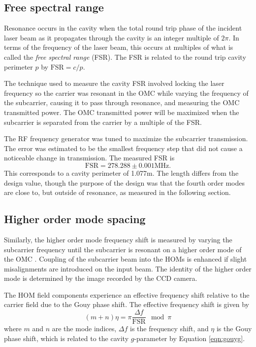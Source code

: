 \subsection{Free spectral range}
\label{sec:FSR}
Resonance occurs in the cavity when the total round trip phase of the incident laser beam as it propagates through the cavity is an integer multiple of $2\pi$. %
In terms of the frequency of the laser beam, this occurs at multiples of what is called the \emph{free spectral range} (FSR). %
The FSR is related to the round trip cavity perimeter $p$ by $\mathrm{FSR}=c/p$.

The technique used to measure the cavity FSR involved locking the laser frequency so the carrier was resonant in the OMC while varying the frequency of the subcarrier, causing it to pass through resonance, and measuring the OMC transmitted power. %
The OMC transmitted power will be maximized when the subcarrier is separated from the carrier by a multiple of the FSR.

The RF frequency generator was tuned to maximize the subcarrier transmission. %
The error was estimated to be the smallest frequency step that did not cause a noticeable change in transmission. %
The measured FSR is
\begin{equation}
\mathrm{FSR}=278.288\pm0.001\text{MHz}.
\end{equation}
This corresponds to a cavity perimeter of 1.077m. %
The length differs from the design value, though the purpose of the design was that the fourth order modes are close to, but outside of resonance, as measured in the following section.

\subsection{Higher order mode spacing}
Similarly, the higher order mode frequency shift is measured by varying the subcarrier frequency until the subcarrier is resonant on a higher order mode of the OMC \cite{Uehara:95}. %
Coupling of the subcarrier beam into the HOMs is enhanced if slight misalignments are introduced on the input beam. %
The identity of the higher order mode is determined by the image recorded by the CCD camera.

The HOM field components experience an effective frequency shift relative to the  carrier field due to the Gouy phase shift. %
The effective frequency shift is given by
\begin{equation}
\label{eqn:gouyshift}
(m+n)\eta=\pi\frac{\Delta f}{\mathrm{FSR}}\mod \pi
\end{equation}
where $m$ and $n$ are the  mode indices, $\Delta f$ is the frequency shift, and $\eta$ is the Gouy phase shift, which is related to the cavity $g$-parameter by Equation \ref{eqn:gouyg}. %


